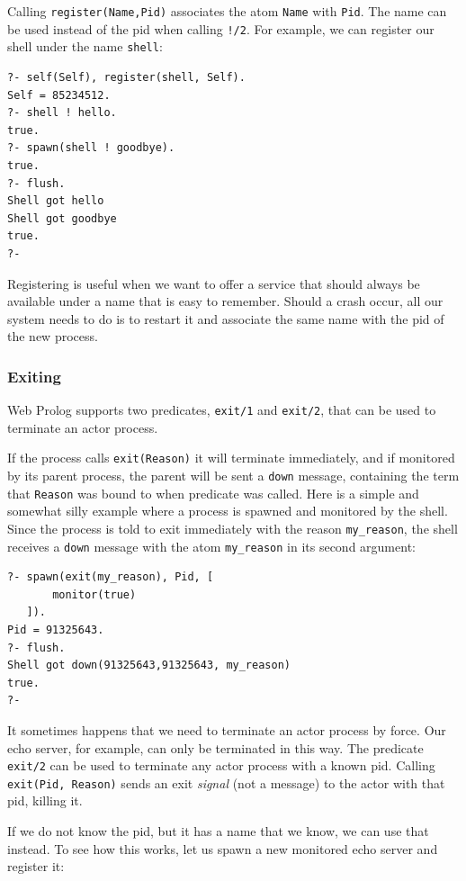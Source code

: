 \noindent Calling \texttt{register(Name,Pid)} associates the atom \texttt{Name} with \texttt{Pid}. The name can be used instead of the pid when calling \texttt{!/2}. For example, we can register our shell under the name \texttt{shell}:

\begin{verbatim}
?- self(Self), register(shell, Self).
Self = 85234512.
?- shell ! hello.
true.
?- spawn(shell ! goodbye).
true.
?- flush.
Shell got hello
Shell got goodbye
true.
?- 
\end{verbatim}

\noindent Registering is useful when we want to offer a service that should always be available under a name that is easy to remember. Should a crash occur, all our system needs to do is to restart it and associate the same name with the pid of the new process.

\subsubsection{Exiting}

Web Prolog supports two predicates, \texttt{exit/1} and \texttt{exit/2}, that can be used to terminate an actor process. 

If the process calls \texttt{exit(Reason)} it will terminate immediately, and if monitored by its parent process, the parent will be sent a \texttt{down} message, containing the term that \texttt{Reason} was bound to when predicate was called. Here is a simple and somewhat silly example where a process is spawned and monitored by the shell. Since the process is told to exit immediately with the reason \texttt{my\_reason}, the shell receives a \texttt{down} message with the atom \texttt{my\_reason} in its second argument:

\begin{verbatim}
?- spawn(exit(my_reason), Pid, [
       monitor(true)
   ]).
Pid = 91325643.
?- flush.
Shell got down(91325643,91325643, my_reason)
true.
?-
\end{verbatim}

\noindent It sometimes happens that we need to terminate an actor process by force. Our echo server, for example, can only be terminated in this way. The predicate \texttt{exit/2} can be used to terminate any actor process with a known pid. Calling \texttt{exit(Pid,\,Reason)} sends an exit \textit{signal} (not a message) to the actor with that pid, killing it.

If we do not know the pid, but it has a name that we know, we can use that instead. To see how this works, let us spawn a new monitored echo server and register it: 

